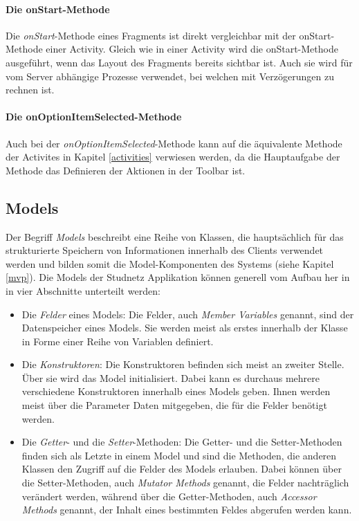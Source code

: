 \documentclass[../main.tex]{subfiles}
\begin{document}
	\paragraph{Die onStart-Methode}
	Die \emph{onStart}-Methode eines Fragments ist direkt vergleichbar mit der onStart-Methode einer Activity. Gleich wie in einer Activity wird die onStart-Methode ausgeführt, wenn das Layout des Fragments bereits sichtbar ist. Auch sie wird für vom Server abhängige Prozesse verwendet, bei welchen mit Verzögerungen zu rechnen ist.
	
	\paragraph{Die onOptionItemSelected-Methode}
	Auch bei der \emph{onOptionItemSelected}-Methode kann auf die äquivalente Methode der Activites in Kapitel \ref{activities} verwiesen werden, da die Hauptaufgabe der Methode das Definieren der Aktionen in der Toolbar ist.
	
	\subsection{Models} \label{models}
	Der Begriff \emph{Models} beschreibt eine Reihe von Klassen, die hauptsächlich für das strukturierte Speichern von Informationen innerhalb des Clients verwendet werden und bilden somit die Model-Komponenten des Systems (siehe Kapitel \ref{mvp}). Die Models der Studnetz Applikation können generell vom Aufbau her in in vier Abschnitte unterteilt werden:
	
	\begin{itemize}
		\item Die \emph{Felder} eines Models: Die Felder, auch \emph{Member Variables} genannt, sind der Datenspeicher eines Models. Sie werden meist als erstes innerhalb der Klasse in Forme einer Reihe von Variablen definiert. \cite{memberVariables}
		\item Die \emph{Konstruktoren}: Die Konstruktoren befinden sich meist an zweiter Stelle. Über sie wird das Model initialisiert. Dabei kann es durchaus mehrere verschiedene Konstruktoren innerhalb eines Models geben. Ihnen werden meist über die Parameter  Daten mitgegeben, die für die Felder benötigt werden.
		\item  Die \emph{Getter}- und die \emph{Setter}-Methoden: Die Getter- und die Setter-Methoden finden sich als Letzte in einem Model und sind die Methoden, die anderen Klassen den Zugriff auf die Felder des Models erlauben. Dabei können über die Setter-Methoden, auch \emph{Mutator Methods} genannt, die Felder nachträglich verändert werden, während über die Getter-Methoden, auch \emph{Accessor Methods} genannt, der Inhalt eines bestimmten Feldes abgerufen werden kann. \cite{accessorsAndMutators}
	\end{itemize}
\end{document}
